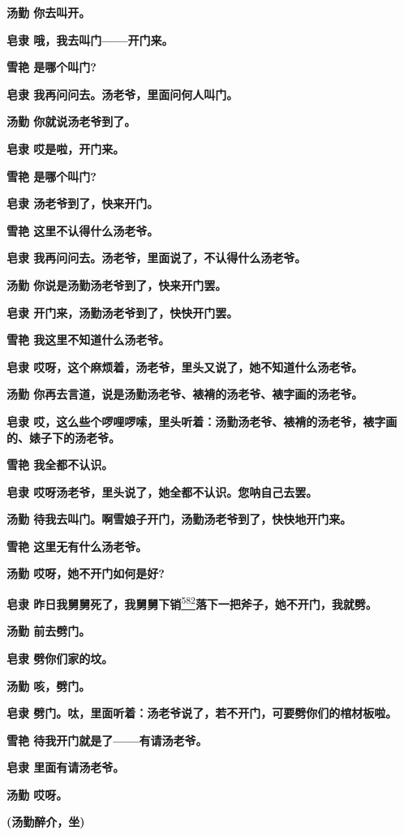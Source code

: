 \textbf{汤勤 你去叫开。}

\textbf{皂隶 哦，我去叫门------开门来。}

\textbf{雪艳 是哪个叫门?}

\textbf{皂隶 我再问问去。汤老爷，里面问何人叫门。}

\textbf{汤勤 你就说汤老爷到了。}

\textbf{皂隶 哎是啦，开门来。}

\textbf{雪艳 是哪个叫门?}

\textbf{皂隶 汤老爷到了，快来开门。}

\textbf{雪艳 这里不认得什么汤老爷。}

\textbf{皂隶 我再问问去。汤老爷，里面说了，不认得什么汤老爷。}

\textbf{汤勤 你说是汤勤汤老爷到了，快来开门罢。}

\textbf{皂隶 开门来，汤勤汤老爷到了，快快开门罢。}

\textbf{雪艳 我这里不知道什么汤老爷。}

\textbf{皂隶 哎呀，这个麻烦着，汤老爷，里头又说了，她不知道什么汤老爷。}

\textbf{汤勤 你再去言道，说是汤勤汤老爷、裱褙的汤老爷、裱字画的汤老爷。}

\textbf{皂隶
哎，这么些个啰哩啰嗦，里头听着：汤勤汤老爷、裱褙的汤老爷，裱字画的、婊子下的汤老爷。}

\textbf{雪艳 我全都不认识。}

\textbf{皂隶 哎呀汤老爷，里头说了，她全都不认识。您呐自己去罢。}

\textbf{汤勤 待我去叫门。啊雪娘子开门，汤勤汤老爷到了，快快地开门来。}

\textbf{雪艳 这里无有什么汤老爷。}

\textbf{汤勤 哎呀，她不开门如何是好?}

\textbf{皂隶
昨日我舅舅死了，我舅舅下销}\protect\hyperlink{fn582}{\textsuperscript{582}}\textbf{落下一把斧子，她不开门，我就劈。}

\textbf{汤勤 前去劈门。}

\textbf{皂隶 劈你们家的坟。}

\textbf{汤勤 咳，劈门。}

\textbf{皂隶
劈门。呔，里面听着：汤老爷说了，若不开门，可要劈你们的棺材板啦。}

\textbf{雪艳 待我开门就是了------有请汤老爷。}

\textbf{皂隶 里面有请汤老爷。}

\textbf{汤勤 哎呀。}

\textbf{(汤勤醉介，坐)}

